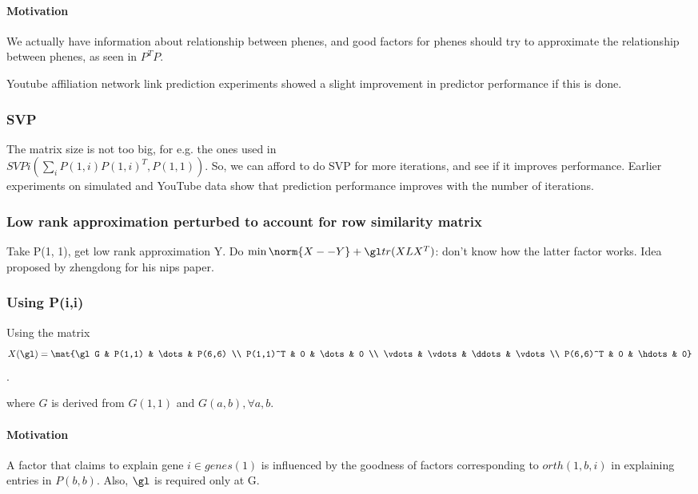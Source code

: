 \documentclass{report}
\begin{document}
\paragraph*{Motivation}
We actually have information about relationship between phenes, and good factors for phenes should try to approximate the relationship between phenes, as seen in $P^{T}P$.

Youtube affiliation network link prediction experiments showed a slight improvement in predictor performance if this is done.

\subsubsection{SVP}
The matrix size is not too big, for e.g. the ones used in\\ $SVPi(\sum_i P(1,i)P(1,i)^T,P(1,1))$. So, we can afford to do SVP for more iterations, and see if it improves performance. Earlier experiments on simulated and YouTube data show that prediction performance improves with the number of iterations.

\subsubsection{Low rank approximation perturbed to account for row similarity matrix}
Take P(1, 1), get low rank approximation Y. Do $\min \norm{X - -Y} + \gl tr(XLX^{T})$: don't know how the latter factor works. Idea proposed by zhengdong for his nips paper.

\subsubsection{Using P(i,i)}
Using the matrix
$$X(\gl) = \mat{\gl G & P(1,1) & \dots & P(6,6) \\
           P(1,1)^T & 0 & \dots & 0 \\
           \vdots & \vdots & \ddots & \vdots \\
           P(6,6)^T & 0 & \hdots & 0}$$.

where $G$ is derived from $G(1,1)$ and $G(a,b), \forall a,b$.

\paragraph*{Motivation}
A factor that claims to explain gene $i \in genes(1)$ is influenced by the goodness of factors corresponding to $orth(1,b,i)$ in explaining entries in $P(b, b)$. Also, $\gl$ is required only at G.
\end{document}
